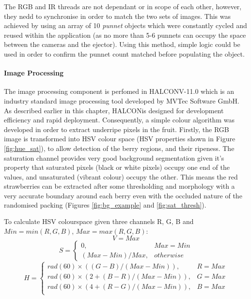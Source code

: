 \documentclass[fleqn,twoside]{article}
\begin{document}
The RGB and IR threads are not dependant or in scope of each other, however, they nedd to synchronise in order to match the two sets of images. This was achieved by using an array of 10 \textit{punnet} objects which were constantly cycled and reused within the application (as no more than 5-6 punnets can occupy the space between the cameras and the ejector). Using this method, simple logic could be used in order to confirm the punnet count matched before populating the object. 



\paragraph{Image Processing}

The image processing component is perfomed in  HALCON\texttrademark V-11.0 which is an industry standard image processing tool developed by MVTec Software GmbH. As described earlier in this chapter, HALCON\texttrademark is designed for development efficiency and rapid deployment. Consequently, a simple colour algorithm was developed in order to extract underripe pixels in the fruit. Firstly, the RGB image is transformed into HSV colour space (HSV properties shown in Figure \ref{fig:hue_sat}), to allow detection of the berry regions, and their ripeness. The saturation channel provides very good background segmentation given it's property that saturated pixels (black or white pixels) occupy one end of the values, and unsaturated (vibrant colour) occupy the other. This means the red strawberries can be extracted after some thresholding and morphology with a very accurate boundary around each berry even with the occluded nature of the randomised packing (Figures \ref{fig:bg_example} and \ref{fig:sat_thresh}).

To calculate HSV colourspace given three channels R, G, B and $Min = min(R, G, B)$, $Max = max(R, G, B)$:
\begin{equation}
	V = Max
\end{equation}
\begin{equation}
	S = 
	\begin{cases} 
		0, & Max=Min \\   
		(Max-Min)/Max, & otherwise        
	\end{cases}
\end{equation}
\begin{equation}
H = 
\begin{cases} 
rad(60) \times ((G-B)/(Max-Min)), & R=Max \\
rad(60) \times (2 + (B-R)/(Max-Min)), & G=Max \\
rad(60) \times (4 + (R-G)/(Max-Min)), & B=Max \\   
\end{cases}
\end{equation}
\end{document}
